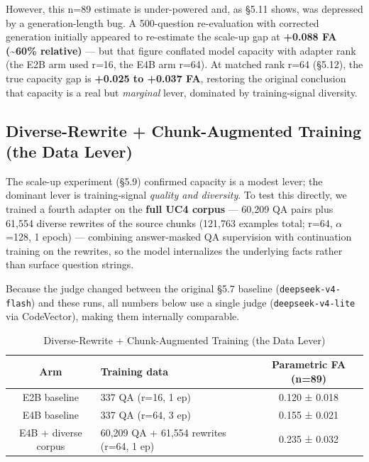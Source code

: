 \documentclass[10pt,twocolumn]{article}
\begin{document}
However, this n=89 estimate is under-powered and, as \S{}5.11 shows, was depressed by a generation-length bug. A 500-question re-evaluation with corrected generation initially appeared to re-estimate the scale-up gap at \textbf{+0.088 FA (\textasciitilde{}60\% relative)} --- but that figure conflated model capacity with adapter rank (the E2B arm used r=16, the E4B arm r=64). At matched rank r=64 (\S{}5.12), the true capacity gap is \textbf{+0.025 to +0.037 FA}, restoring the original conclusion that capacity is a real but \textit{marginal} lever, dominated by training-signal diversity.


\subsection{Diverse-Rewrite + Chunk-Augmented Training (the Data Lever)}

The scale-up experiment (\S{}5.9) confirmed capacity is a modest lever; the dominant lever is training-signal \textit{quality and diversity}. To test this directly, we trained a fourth adapter on the \textbf{full UC4 corpus} --- 60,209 QA pairs plus 61,554 diverse rewrites of the source chunks (121,763 examples total; r=64, $\alpha$=128, 1 epoch) --- combining answer-masked QA supervision with continuation training on the rewrites, so the model internalizes the underlying facts rather than surface question strings.


Because the judge changed between the original \S{}5.7 baseline (\texttt{deepseek-v4-flash}) and these runs, all numbers below use a single judge (\texttt{deepseek-v4-lite} via CodeVector), making them internally comparable.


\begin{table}[htbp]
  \centering\small
  \caption{Diverse-Rewrite + Chunk-Augmented Training (the Data Lever)}
  \label{tab:diverse-rewrite-chunk-augmented-training-the-data-lever}
  \begin{tabularx}{\columnwidth}{cLc}
  \toprule
    Arm & Training data & Parametric FA (n=89) \\
  \midrule
  \midrule
  E2B baseline & 337 QA (r=16, 1 ep) & 0.120 ± 0.018 \\
  E4B baseline & 337 QA (r=64, 3 ep) & 0.155 ± 0.021 \\
  E4B + diverse corpus & 60,209 QA + 61,554 rewrites (r=64, 1 ep) & 0.235 ± 0.032 \\
  \bottomrule
  \end{tabularx}
\end{table}
\end{document}
